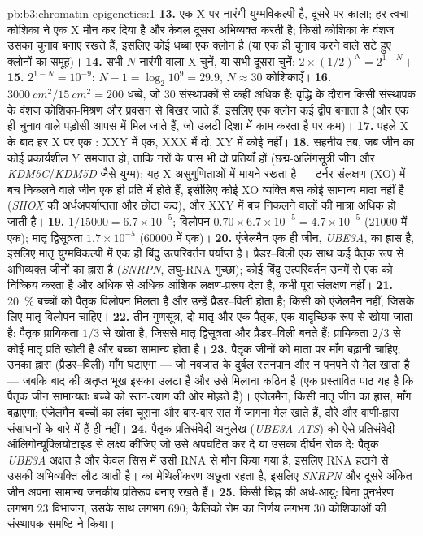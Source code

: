 \begin{solution}{pb:b3:chromatin-epigenetics:1}
\textbf{13.} एक X पर नारंगी युग्मविकल्पी है, दूसरे पर काला; हर
त्वचा-कोशिका ने एक X मौन कर दिया है और केवल दूसरा अभिव्यक्त करती है;
किसी कोशिका के वंशज उसका चुनाव बनाए रखते हैं, इसलिए कोई धब्बा एक क्लोन
है (या एक ही चुनाव करने वाले सटे हुए क्लोनों का समूह)।
\textbf{14.} सभी $N$ नारंगी वाला X चुनें, या सभी दूसरा चुनें:
$2\times (1/2)^{N} = 2^{1-N}$।
\textbf{15.} $2^{1-N} = 10^{-9}$: $N - 1 = \log_{2} 10^{9} = 29.9$,
$N \approx 30$ कोशिकाएँ।
\textbf{16.} $\qty{3000}{cm^2}/\qty{15}{cm^2} = 200$ धब्बे, जो $30$
संस्थापकों से कहीं अधिक हैं: वृद्धि के दौरान किसी संस्थापक के वंशज
कोशिका-मिश्रण और प्रवसन से बिखर जाते हैं, इसलिए एक क्लोन कई द्वीप
बनाता है (और एक ही चुनाव वाले पड़ोसी आपस में मिल जाते हैं, जो उलटी
दिशा में काम करता है पर कम)।
\textbf{17.} पहले X के बाद हर X पर एक : XXY में एक, XXX में
दो, XY में कोई नहीं।
\textbf{18.} सहनीय तब, जब जीन का कोई प्रकार्यशील Y समजात हो, ताकि नरों
के पास भी दो प्रतियाँ हों (छद्म-अलिंगसूत्री जीन और
\emph{KDM5C}/\emph{KDM5D} जैसे युग्म); यह X असुगुणिताओं में मायने रखता
है --- टर्नर संलक्षण (XO) में बच निकलने वाले जीन एक ही प्रति में होते
हैं, इसीलिए कोई XO व्यक्ति बस कोई सामान्य मादा नहीं है (\emph{SHOX}
की अर्धअपर्याप्तता और छोटा कद), और XXY में बच निकलने वालों की मात्रा
अधिक हो जाती है।
\textbf{19.} $1/\num{15000} = 6.7\times 10^{-5}$; विलोपन $0.70\times
6.7\times 10^{-5} = 4.7\times 10^{-5}$ (\num{21000} में एक); मातृ
द्विसूत्रता $1.7\times 10^{-5}$ (\num{60000} में एक)।
\textbf{20.} एंजेलमैन एक ही जीन, \emph{UBE3A}, का ह्रास है, इसलिए मातृ
युग्मविकल्पी में एक ही बिंदु उत्परिवर्तन पर्याप्त है। प्रैडर--विली एक
साथ कई पैतृक रूप से अभिव्यक्त जीनों का ह्रास है (\emph{SNRPN},
लघु-RNA गुच्छा); कोई बिंदु उत्परिवर्तन उनमें से एक को निष्क्रिय करता
है और अधिक से अधिक आंशिक लक्षण-प्ररूप देता है, कभी पूरा संलक्षण नहीं।
\textbf{21.} \qty{20}{\%} बच्चों को पैतृक विलोपन मिलता है और उन्हें
प्रैडर--विली होता है; किसी को एंजेलमैन नहीं, जिसके लिए मातृ विलोपन
चाहिए।
\textbf{22.} तीन गुणसूत्र, दो मातृ और एक पैतृक, एक यादृच्छिक रूप से
खोया जाता है: पैतृक प्रायिकता $1/3$ से खोता है, जिससे मातृ
द्विसूत्रता और प्रैडर--विली बनते हैं; प्रायिकता $2/3$ से कोई मातृ
प्रति खोती है और बच्चा सामान्य होता है।
\textbf{23.} पैतृक जीनों को माता पर माँग बढ़ानी चाहिए; उनका ह्रास
(प्रैडर--विली) माँग घटाएगा --- जो नवजात के दुर्बल स्तनपान और न पनपने
से मेल खाता है --- जबकि बाद की अतृप्त भूख इसका उलटा है और उसे मिलाना
कठिन है (एक प्रस्तावित पाठ यह है कि पैतृक जीन सामान्यतः बच्चे को
स्तन-त्याग की ओर मोड़ते हैं)। एंजेलमैन, किसी मातृ जीन का ह्रास, माँग
बढ़ाएगा; एंजेलमैन बच्चों का लंबा चूसना और बार-बार रात में जागना मेल
खाते हैं, दौरे और वाणी-ह्रास संसाधनों के बारे में हैं ही नहीं।
\textbf{24.} पैतृक प्रतिसंवेदी अनुलेख (\emph{UBE3A-ATS}) को ऐसे
प्रतिसंवेदी ऑलिगोन्यूक्लियोटाइड से लक्ष्य कीजिए जो उसे अपघटित कर दे
या उसका दीर्घन रोक दे: पैतृक \emph{UBE3A} अक्षत है और केवल सिस में उसी
RNA से मौन किया गया है, इसलिए RNA हटाने से उसकी अभिव्यक्ति लौट आती है।
 का मेथिलीकरण अछूता रहता है, इसलिए \emph{SNRPN}
और दूसरे अंकित जीन अपना सामान्य जनकीय प्रतिरूप बनाए रखते हैं।
\textbf{25.} किसी चिह्न की अर्ध-आयु: बिना पुनर्भरण लगभग $23$ विभाजन,
उसके साथ लगभग $690$; कैलिको रोम का निर्णय लगभग $30$ कोशिकाओं की
संस्थापक समष्टि ने किया।
\end{solution}
